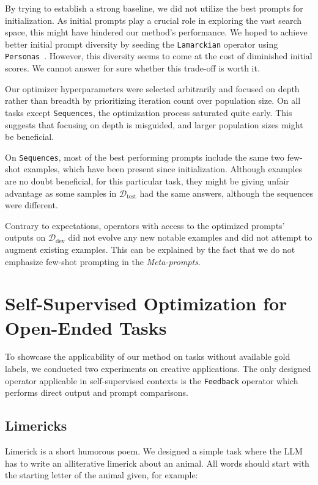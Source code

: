 By trying to establish a strong baseline, we did not utilize the best prompts for initialization. 
As initial prompts play a crucial role\cite{yang2024dualphaseacceleratedpromptoptimization} in exploring the vast search space,
this might have hindered our method's performance. We hoped to achieve better initial prompt diversity by seeding the \texttt{Lamarckian} operator using \texttt{Personas}~\cite{ge2024scalingsyntheticdatacreation}.
However, this diversity seems to come at the cost of diminished initial scores. We cannot answer for sure whether this trade-off is worth it. 

Our optimizer hyperparameters were selected arbitrarily and focused on depth rather than breadth by prioritizing iteration count over population size.
On all tasks except \texttt{Sequences}, the optimization process saturated quite early. This suggests that focusing on depth is misguided,
and larger population sizes might be beneficial.

On \texttt{Sequences}, most of the best performing prompts include the same two few-shot examples, which have been present since initialization.
Although examples are no doubt beneficial, for this particular task, they might be giving unfair advantage as some 
samples in $\mathcal{D}_{\text{test}}$ had the same answers, although the sequences were different. 

Contrary to expectations, operators with access to the optimized prompts' outputs on $\mathcal{D}_{\text{dev}}$ did not evolve any new notable examples
and did not attempt to augment existing examples. This can be explained by the fact that we do not emphasize few-shot prompting in the \textit{Meta-prompts}.

\section{Self-Supervised Optimization for Open-Ended Tasks}
To showcase the applicability of our method on tasks without available gold labels, we conducted two experiments
on creative applications. The only designed operator applicable in self-supervised contexts is the \texttt{Feedback} 
operator which performs direct output and prompt comparisons.

\subsection{Limericks}
Limerick is a short humorous poem. We designed a simple task where the LLM has to write an alliterative limerick about an animal. 
All words should start with the starting letter of the animal given, for example:

